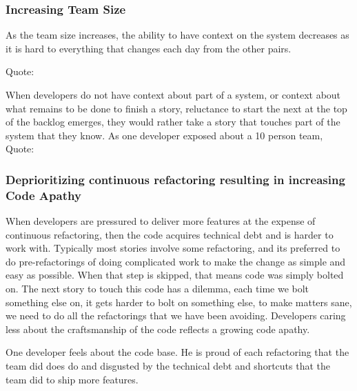 \subsubsection{Increasing Team Size}
As the team size increases, the ability to have context on the system decreases as it is hard to everything that changes each day from the other pairs. 

Quote: 

When developers do not have context about part of a system, or context about what remains to be done to finish a story, reluctance to start the next at the top of the backlog emerges, they would rather take a story that touches part of the system that they know. As one developer exposed about a 10 person team, Quote: 

\subsubsection{ Deprioritizing continuous refactoring resulting in increasing Code Apathy  }

When developers are pressured to deliver more features at the expense of continuous refactoring, then the code acquires technical debt and is harder to work with. Typically most stories involve some refactoring, and its preferred to do pre-refactorings of doing complicated work to make the change as simple and easy as possible. When that step is skipped, that means code was simply bolted on. The next story to touch this code has a dilemma, each time we bolt something else on, it gets harder to bolt on something else, to make matters sane, we need to do all the refactorings that we have been avoiding. Developers caring less about the craftsmanship of the code reflects a growing code apathy. 

One developer feels  about the code base. He is proud of each refactoring that the team did does do and disgusted by the technical debt and shortcuts that the team did to ship more features. 

